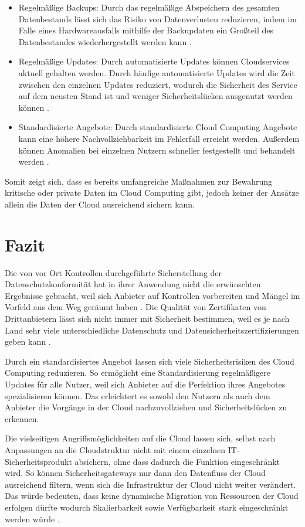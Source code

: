 \begin{itemize}
\item 
Regelmäßige Backups: Durch das regelmäßige Abspeichern des gesamten Datenbestands lässt sich das Risiko von Datenverlusten reduzieren, indem im Falle eines Hardwareausfalls mithilfe der Backupdaten ein Großteil des Datenbestandes wiederhergestellt werden kann \cite{wehrhahn-aklender2019}.
\item
Regelmäßige Updates: Durch automatisierte Updates können Cloudservices aktuell gehalten werden. Durch häufige automatisierte Updates wird die Zeit zwischen den einzelnen Updates reduziert, wodurch die Sicherheit des Service auf dem neusten Stand ist und weniger Sicherheitslücken ausgenutzt werden können \cite{wehrhahn-aklender2019}.
\item
Standardisierte Angebote: Durch standardisierte Cloud Computing Angebote kann eine höhere Nachvollziehbarkeit im Fehlerfall erreicht werden. Außerdem können Anomalien bei einzelnen Nutzern schneller festgestellt und behandelt werden \cite{wehrhahn-aklender2019}.
\end{itemize}

Somit zeigt sich, dass es bereits umfangreiche Maßnahmen zur Bewahrung kritische oder private Daten im Cloud Computing gibt, jedoch keiner der Ansätze allein die Daten der Cloud ausreichend sichern kann.


\section{Fazit}
Die von vor Ort Kontrollen durchgeführte Sicherstellung der Datenschutzkonformität hat in ihrer Anwendung nicht die erwünschten Ergebnisse gebracht, weil sich Anbieter auf Kontrollen vorbereiten und Mängel im Vorfeld aus dem Weg geräumt haben \cite{selzer2020}.
Die Qualität von Zertifikaten von Drittanbietern lässt sich nicht immer mit Sicherheit bestimmen, weil es je nach Land sehr viele unterschiedliche Datenschutz und Datensicherheitszertifizierungen geben kann \cite{selzer2020}.

Durch ein standardisiertes Angebot lassen sich viele Sicherheitsrisiken des Cloud Computing reduzieren. So ermöglicht eine Standardisierung regelmäßigere Updates für alle Nutzer, weil sich Anbieter auf die Perfektion ihres Angebotes spezialisieren können. Das erleichtert es sowohl den Nutzern als auch dem Anbieter die Vorgänge in der Cloud nachzuvollziehen und Sicherheitslücken zu erkennen. 

Die vielseitigen Angriffsmöglichkeiten auf die Cloud lassen sich, selbst nach Anpassungen an die Cloudstruktur nicht mit einem einzelnen IT-Sicherheitsprodukt absichern, ohne dass dadurch die Funktion eingeschränkt wird. So können Sicherheitsgateways nur dann den Datenfluss der Cloud ausreichend filtern, wenn sich die Infrastruktur der Cloud nicht weiter verändert. Das würde bedeuten, dass keine dynamische Migration von Ressourcen der Cloud erfolgen dürfte wodurch Skalierbarkeit sowie Verfügbarkeit stark eingeschränkt werden würde \cite{wehrhahn-aklender2019}.

